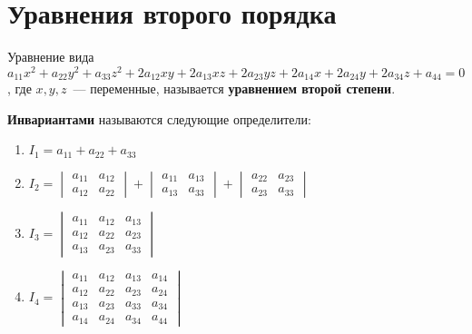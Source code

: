 \section{Уравнения второго порядка}
Уравнение вида $a_{11} x^2 + a_{22} y^2 + a_{33} z^2 + 2 a_{12} xy + 2 a_{13} xz + 2 a_{23} yz + 2 a_{14} x + 2 a_{24} y + 2 a_{34} z + a_{44} = 0$, где $x, y, z$~--- переменные, называется \textbf{уравнением второй степени}.

\textbf{Инвариантами} называются следующие определители:
\begin{enumerate}
	\item $I_1 = a_{11} + a_{22} + a_{33}$
	
	\item $I_2 =
	\begin{vmatrix}
	a_{11} & a_{12} \\
	a_{12} & a_{22}
	\end{vmatrix} +
	\begin{vmatrix}
	a_{11} & a_{13} \\
	a_{13} & a_{33}
	\end{vmatrix} +
	\begin{vmatrix}
	a_{22} & a_{23} \\
	a_{23} & a_{33}
	\end{vmatrix}$
	
	\item $I_3 =
	\begin{vmatrix}
	a_{11} & a_{12} & a_{13} \\
	a_{12} & a_{22} & a_{23} \\
	a_{13} & a_{23} & a_{33}
	\end{vmatrix}$
	
	\item $I_4 =
	\begin{vmatrix}
	a_{11} & a_{12} & a_{13} & a_{14} \\
	a_{12} & a_{22} & a_{23} & a_{24} \\
	a_{13} & a_{23} & a_{33} & a_{34} \\
	a_{14} & a_{24} & a_{34} & a_{44}
	\end{vmatrix}$
\end{enumerate}

